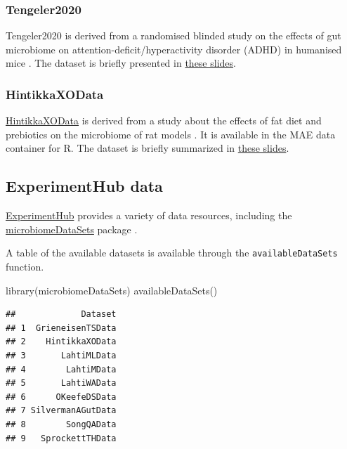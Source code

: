 \documentclass[
]{book}
\newenvironment{Shaded}{\begin{snugshade}}{\end{snugshade}}
\newcommand{\FunctionTok}[1]{\textcolor[rgb]{0.00,0.00,0.00}{#1}}
\newcommand{\NormalTok}[1]{#1}
\begin{document}
\hypertarget{tengeler-desc}{%
\subsubsection{Tengeler2020}\label{tengeler-desc}}

Tengeler2020 is derived from a randomised blinded study on the effects of gut
microbiome on attention-deficit/hyperactivity disorder (ADHD) in humanised mice
\citep{Tengeler2020}. The dataset is briefly presented in
\href{https://microbiome.github.io/outreach/tengeler2020_presentation.html}{these slides}.

\hypertarget{hintikka-desc}{%
\subsubsection{HintikkaXOData}\label{hintikka-desc}}

\href{https://microbiome.github.io/microbiomeDataSets/reference/HintikkaXOData.html}{HintikkaXOData}
is derived from a study about the effects of fat diet and prebiotics on the
microbiome of rat models \citep{Hintikka2021}. It is available in the MAE data
container for R. The dataset is briefly summarized in
\href{https://microbiome.github.io/outreach/hintikkaxo_presentation.html}{these slides}.

\hypertarget{experimenthub-data}{%
\subsection{ExperimentHub data}\label{experimenthub-data}}

\href{https://bioconductor.org/packages/release/bioc/vignettes/ExperimentHub/inst/doc/ExperimentHub.html}{ExperimentHub}
provides a variety of data resources, including the
\href{https://bioconductor.org/packages/release/data/experiment/html/microbiomeDataSets.html}{microbiomeDataSets}
package \citep{Morgan2021, microlahti2021}.

A table of the available datasets is available through the
\texttt{availableDataSets} function.

\begin{Shaded}
\begin{Highlighting}[]
\FunctionTok{library}\NormalTok{(microbiomeDataSets)}
\FunctionTok{availableDataSets}\NormalTok{()}
\end{Highlighting}
\end{Shaded}

\begin{verbatim}
##             Dataset
## 1  GrieneisenTSData
## 2    HintikkaXOData
## 3       LahtiMLData
## 4        LahtiMData
## 5       LahtiWAData
## 6      OKeefeDSData
## 7 SilvermanAGutData
## 8        SongQAData
## 9   SprockettTHData
\end{verbatim}
\end{document}
